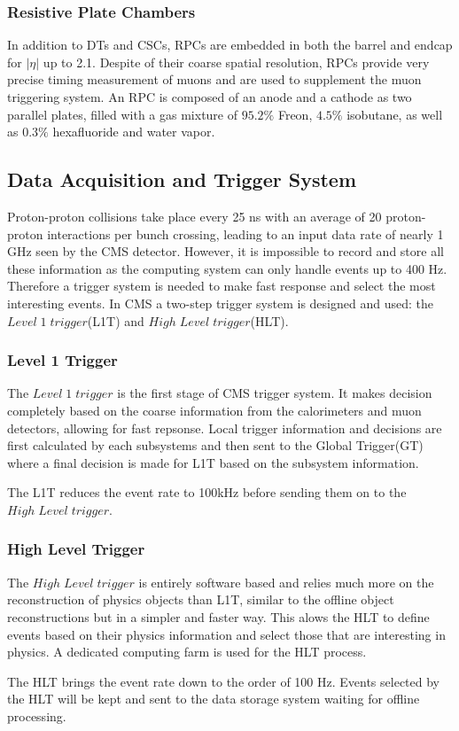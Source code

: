 \subsubsection{Resistive Plate Chambers}
In addition to DTs and CSCs, RPCs are embedded in both the barrel and endcap for $|\eta|$ up to 2.1. Despite of their coarse spatial resolution, RPCs provide very precise timing measurement of muons and are used to supplement the muon triggering system. An RPC is composed of an anode and a cathode as two parallel plates, filled with a gas mixture of $95.2\%$ Freon, $4.5\%$ isobutane, as well as $0.3\%$ hexafluoride and water vapor.

\subsection{Data Acquisition and Trigger System} 
Proton-proton collisions take place every 25 ns with an average of 20 proton-proton interactions per bunch crossing, leading to an input data rate of nearly 1 GHz seen by the CMS detector. However, it is impossible to record and store all these information as the computing system can only handle events up to 400 Hz. Therefore a trigger system is needed to make fast response and select the most interesting events. In CMS a two-step trigger system is designed and used\cite{lhc_cmstrigger}: the $Level\; 1\; trigger$(L1T) and $High\; Level\; trigger$(HLT).

\subsubsection{Level 1 Trigger}
The $Level\; 1\; trigger$ is the first stage of CMS trigger system. It makes decision completely based on the coarse information from the calorimeters and muon detectors, allowing for fast repsonse. Local trigger information and decisions are first calculated by each subsystems and then sent to the Global Trigger(GT) where a final decision is made for L1T based on the subsystem information.

\vspace{0.3cm}
The L1T reduces the event rate to 100kHz before sending them on to the $High\; Level\; trigger$.

\subsubsection{High Level Trigger}
The $High\; Level\; trigger$ is entirely software based and relies much more on the reconstruction of physics objects than L1T, similar to the offline object reconstructions but in a simpler and faster way. This alows the HLT to define events based on their physics information and select those that are interesting in physics. A dedicated computing farm is used for the HLT process.

\vspace{0.3cm}
The HLT brings the event rate down to the order of 100 Hz. Events selected by the HLT will be kept and sent to the data storage system waiting for offline processing.

